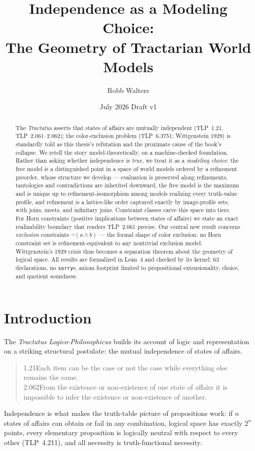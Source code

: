 \documentclass[10pt, letterpaper]{article}
\title{Independence as a Modeling Choice:\\
  The Geometry of Tractarian World Models}
\author{Robb Walters}
\date{July 2026 \quad\textbar\quad Draft v1}
\theoremstyle{remark}
\newcommand{\lean}[1]{\texttt{#1}}
\newcommand{\TLP}[1]{TLP~#1}
\begin{document}
\maketitle

\begin{abstract}
The \emph{Tractatus} asserts that states of affairs are mutually independent
(\TLP{1.21}, \TLP{2.061--2.062}); the color-exclusion problem (\TLP{6.3751};
Wittgenstein 1929) is standardly told as this thesis's refutation and the
proximate cause of the book's collapse. We retell the story
model-theoretically, on a machine-checked foundation. Rather than asking
whether independence is \emph{true}, we treat it as a \emph{modeling choice}:
the free model is a distinguished point in a space of world models ordered by
a refinement preorder, whose structure we develop --- evaluation is preserved
along refinements, tautologies and contradictions are inherited downward, the
free model is the maximum and is unique up to refinement-isomorphism among
models realizing every truth-value profile, and refinement is a lattice-like
order captured exactly by image-profile sets, with joins, meets, and
infinitary joins. Constraint classes carve this space into tiers. For Horn
constraints (positive implications between states of affairs) we state an
exact realizability boundary that renders \TLP{2.061} precise. Our central
new result concerns \emph{exclusion} constraints
$\neg(a \wedge b)$ --- the formal shape of color exclusion: no Horn constraint
set is refinement-equivalent to any nontrivial exclusion model. Wittgenstein's
1929 crisis thus becomes a separation theorem about the geometry of logical
space. All results are formalized in Lean~4 and checked by its kernel: 63
declarations, no \lean{sorry}s, axiom footprint limited to propositional
extensionality, choice, and quotient soundness.
\end{abstract}

\section{Introduction}\label{sec:intro}

The \emph{Tractatus Logico-Philosophicus} builds its account of logic and
representation on a striking structural postulate: the mutual independence of
states of affairs.
\begin{quote}
  1.21\quad Each item can be the case or not the case while everything else
  remains the same.\\[2pt]
  2.062\quad From the existence or non-existence of one state of affairs it is
  impossible to infer the existence or non-existence of another.
  \cite{wittgenstein1921}
\end{quote}
Independence is what makes the truth-table picture of propositions work:
if $n$ states of affairs can obtain or fail in any combination, logical space
has exactly $2^n$ points, every elementary proposition is logically neutral
with respect to every other (\TLP{4.211}), and all necessity is truth-functional
necessity.
\end{document}
